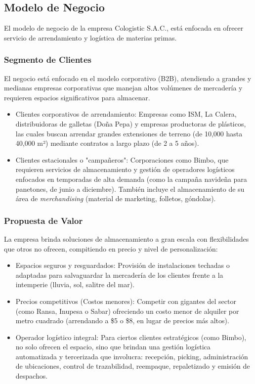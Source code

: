 \documentclass[11pt]{article}
\begin{document}
\subsection{Modelo de Negocio}

El modelo de negocio de la empresa Cologistic S.A.C., está enfocada en
ofrecer servicio de arrendamiento y logística de materias primas.

\subsubsection{Segmento de Clientes} El negocio está enfocado en el
modelo corporativo (B2B), atendiendo a grandes y medianas empresas
corporativas que manejan altos volúmenes de mercadería y requieren
espacios significativos para almacenar.

\begin{itemize}
\item
  Clientes corporativos de arrendamiento: Empresas como ISM, La Calera,
  distribuidoras de galletas (Doña Pepa) y empresas productoras de
  plásticos, las cuales buscan arrendar grandes extensiones de terreno
  (de 10,000 hasta 40,000 m²) mediante contratos a largo plazo (de 2 a 5
  años).
\item
  Clientes estacionales o "campañeros": Corporaciones como Bimbo, que
  requieren servicios de almacenamiento y gestión de operadores
  logísticos enfocados en temporadas de alta demanda (como la campaña
  navideña para panetones, de junio a diciembre). También incluye el
  almacenamiento de su área de \emph{merchandising} (material de
  marketing, folletos, góndolas).
\end{itemize}

\subsubsection{Propuesta de Valor} La empresa brinda soluciones de
almacenamiento a gran escala con flexibilidades que otros no ofrecen,
compitiendo en precio y nivel de personalización:

\begin{itemize}
\item
  Espacios seguros y resguardados: Provisión de instalaciones techadas o
  adaptadas para salvaguardar la mercadería de los clientes frente a la
  intemperie (lluvia, sol, salitre del mar).
\item
  Precios competitivos (Costos menores): Competir con gigantes del
  sector (como Ransa, Inupesa o Sabar) ofreciendo un costo menor de
  alquiler por metro cuadrado (arrendando a \$5 o \$8, en lugar de
  precios más altos).
\item
  Operador logístico integral: Para ciertos clientes estratégicos (como
  Bimbo), no solo ofrecen el espacio, sino que brindan una gestión
  logística automatizada y tercerizada que involucra: recepción,
  picking, administración de ubicaciones, control de trazabilidad,
  reempaque, repaletizado y emisión de despachos.
\end{itemize}
\end{document}

